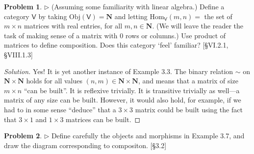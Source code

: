 \documentclass[fontsize=14pt]{scrartcl}
\theoremstyle{definition}
\newtheorem{problem-internal}{Problem}[subsection]
\newenvironment{problem}{
  \medskip
  \begin{problem-internal}
}{
  \end{problem-internal}
}
\newenvironment{solution}{
  \begin{proof}[Solution]
  \vspace{-8px}
  \setlength{\parskip}{4px}
  \setlength{\parindent}{0px}
}{
  \end{proof}
}
\newcommand{\Obj}{\mathrm{Obj}}
\newcommand{\Hom}{\mathrm{Hom}}
\begin{document}
\begin{problem}
$\rhd$ (Assuming some familiarity with linear algebra.) Define a category
$\mathsf{V}$ by taking $\Obj(\mathsf{V}) = \mathbf{N}$ and letting
$\Hom_{\mathsf{V}}(m,n) = $ the set of $m\times n$ matrices with real
entries, for all $m,n\in\mathbf{N}$. (We will leave the reader the task of
making sense of a matrix with 0 rows or columns.) Use product of matrices to
define composition. Does this category `feel' familiar? [\S VI.2.1, \S VIII.1.3]
\end{problem}

\begin{solution}
Yes! It is yet another instance of Example 3.3. The binary relation $\sim$ on
$\mathbf{N} \times \mathbf{N}$ holds for all values $(n,m)\in\mathbf{N} \times
\mathbf{N}$, and means that a matrix of size $m\times n$ ``can be built''. It is
reflexive trivially. It is transitive trivially as well---a matrix of any size
can be built. However, it would also hold, for example, if we had to in some
sense ``deduce'' that a $3\times 3$ matrix could be built using the fact that
$3\times 1$ and $1\times 3$ matrices can be built.
\end{solution}


\begin{problem}
$\rhd$ Define carefully the objects and morphisms in Example 3.7, and draw the
diagram corresponding to compositon. [\S 3.2]
\end{problem}
\end{document}
